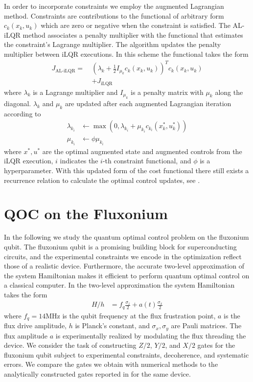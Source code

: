 \documentclass[
  amsfonts,
  amsmath,
  tbtags,
  amssymb,
  aps,
  nobibnotes,
  twocolumn,
  superscriptaddress,
]{revtex4-2}
\begin{document}
In order to incorporate constraints we employ
the augmented Lagrangian method. Constraints are contributions
to the functional of arbitrary form $c_{k}(x_{k}, u_{k})$ which are
zero or negative when the constraint is satisfied. The AL-iLQR
method associates a penalty multiplier with the functional
that estimates the constraint's Lagrange multiplier.
The algorithm updates the penalty multiplier between
iLQR executions. In this scheme the functional takes the form
\begin{equation}
  \begin{aligned}
    J_{\textrm{AL-iLQR}} = \ &(\lambda_{k} + \frac{1}{2}I_{\mu_{k}} c_{k}(x_{k}, u_{k}))^{T} c_{k}(x_{k}, u_{k})\\
    &+ J_{\textrm{iLQR}}
  \end{aligned}
\end{equation}
where $\lambda_{k}$ is a Lagrange multiplier and $I_{\mu_{k}}$ is a penalty matrix
with $\mu_{k}$ along the diagonal.
$\lambda_{k}$ and $\mu_{k}$ are updated after each augmented Lagrangian iteration according to
\begin{align}
  \lambda_{k_{i}} &\gets \max(0, \lambda_{k_{i}} + \mu_{k_{i}} c_{k_{i}}(x_{k}^{*}, u_{k}^{*}))\\
  \mu_{k_{i}} &\gets \phi \mu_{k_{i}}
\end{align}
where $x^{*}, u^{*}$ are the optimal augmented state and augmented controls from the iLQR execution,
$i$ indicates the $i$-th constraint functional,
and $\phi$ is a hyperparameter. With this updated form of the cost
functional there still exists a recurrence relation to calculate the optimal control
updates, see \cite{howell2019altro}.


\section{QOC on the Fluxonium}
In the following we study
the quantum optimal control problem on the fluxonium qubit.
The fluxonium qubit is a promising building block for superconducting
circuits, and the experimental constraints we encode in the optimization reflect
those of a realistic device. Furthermore, the accurate
two-level approximation of the system Hamiltonian makes it
efficient to perform quantum optimal control on
a classical computer. In the two-level
approximation the system Hamiltonian takes the form
\label{eq:hamiltonian}
\begin{align}
  H/h &= f_{q} \frac{\sigma_{z}}{2} + a(t) \frac{\sigma_{x}}{2}
\end{align}
where $f_{q} = 14$MHz is the qubit frequency at the flux frustration point,
$a$ is the flux drive amplitude, $h$ is Planck's constant, and $\sigma_{x}, \sigma_{y}$
are Pauli matrices. The flux amplitude $a$ is experimentally
realized by modulating the flux 
threading the device. We consider the task of constructing $Z/2$, $Y/2$, and $X/2$
gates for the fluxonium qubit subject to experimental constraints, decoherence, and
systematic errors. We compare the gates we obtain with numerical
methods to the analytically constructed gates reported in
\cite{zhang2020universal} for the same device.
\end{document}
